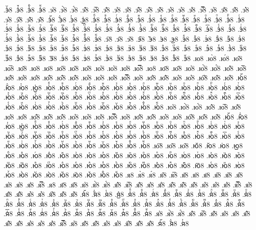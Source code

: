 {.э҅꙼8
.э҅꙽8
.э҅ꚞ8
.э҅ꚟ8
.э҆8
.э҆̀8
.э҆́8
.э҆̂8
.э҆̅8
.э҆̆8
.э҆̇8
.э҆̈8
.э҆̋8
.э҆̏8
.э҆̑8
.э҆̓8
.э҆̔8
.э҆̾8
.э҆̿8
.э҆͘8
.э҆҃8
.э҆҄8
.э҆҅8
.э҆҆8
.э҆҇8
.э҆᷀8
.э҆᷁8
.э҆᷶8
.э᷷҆8
.э᷸҆8
.э᷹҆8
.э҆ⷠ8
.э҆ⷡ8
.э҆ⷢ8
.э҆ⷣ8
.э҆ⷤ8
.э҆ⷥ8
.э҆ⷦ8
.э҆ⷧ8
.э҆ⷨ8
.э҆ⷩ8
.э҆ⷪ8
.э҆ⷫ8
.э҆ⷬ8
.э҆ⷭ8
.э҆ⷮ8
.э҆ⷯ8
.э҆ⷰ8
.э҆ⷱ8
.э҆ⷲ8
.э҆ⷳ8
.э҆ⷴ8
.э҆ⷵ8
.э҆ⷶ8
.э҆ⷷ8
.э҆ⷸ8
.э҆ⷹ8
.э҆ⷺ8
.э҆ⷻ8
.э҆ⷼ8
.э҆ⷽ8
.э҆ⷾ8
.э҆ⷿ8
.э҆꙯8
.э҆ꙴ8
.э҆ꙵ8
.э҆ꙶ8
.э҆ꙷ8
.э҆ꙸ8
.э҆ꙹ8
.э҆ꙺ8
.э҆ꙻ8
.э҆꙼8
.э҆꙽8
.э҆ꚞ8
.э҆ꚟ8
.э҇8
.э᷀8
.э᷁8
.э᷶8
.э᷷8
.э᷸8
.э᷹8
.эⷠ8
.эⷡ8
.эⷢ8
.эⷣ8
.эⷤ8
.эⷥ8
.эⷦ8
.эⷧ8
.эⷨ8
.эⷩ8
.эⷪ8
.эⷫ8
.эⷬ8
.эⷭ8
.эⷮ8
.эⷯ8
.эⷰ8
.эⷱ8
.эⷲ8
.эⷳ8
.эⷴ8
.эⷵ8
.эⷶ8
.эⷷ8
.эⷸ8
.эⷹ8
.эⷺ8
.эⷻ8
.эⷼ8
.эⷽ8
.эⷾ8
.эⷿ8
.э꙯8
.эꙴ8
.эꙵ8
.эꙶ8
.эꙷ8
.эꙸ8
.эꙹ8
.эꙺ8
.эꙻ8
.э꙼8
.э꙽8
.эꚞ8
.эꚟ8
.ю8
.ю̀8
.ю́8
.ю̂8
.ю̅8
.ю̆8
.ю̇8
.ю̈8
.ю̋8
.ю̏8
.ю̑8
.ю̓8
.ю̔8
.ю̾8
.ю̿8
.ю͘8
.ю҃8
.ю҄8
.ю҅8
.ю҅̀8
.ю҅́8
.ю҅̂8
.ю҅̅8
.ю҅̆8
.ю҅̇8
.ю҅̈8
.ю҅̋8
.ю҅̏8
.ю҅̑8
.ю҅̓8
.ю҅̔8
.ю҅̾8
.ю҅̿8
.ю҅͘8
.ю҅҃8
.ю҅҄8
.ю҅҅8
.ю҅҆8
.ю҅҇8
.ю҅᷀8
.ю҅᷁8
.ю҅᷶8
.ю᷷҅8
.ю᷸҅8
.ю᷹҅8
.ю҅ⷠ8
.ю҅ⷡ8
.ю҅ⷢ8
.ю҅ⷣ8
.ю҅ⷤ8
.ю҅ⷥ8
.ю҅ⷦ8
.ю҅ⷧ8
.ю҅ⷨ8
.ю҅ⷩ8
.ю҅ⷪ8
.ю҅ⷫ8
.ю҅ⷬ8
.ю҅ⷭ8
.ю҅ⷮ8
.ю҅ⷯ8
.ю҅ⷰ8
.ю҅ⷱ8
.ю҅ⷲ8
.ю҅ⷳ8
.ю҅ⷴ8
.ю҅ⷵ8
.ю҅ⷶ8
.ю҅ⷷ8
.ю҅ⷸ8
.ю҅ⷹ8
.ю҅ⷺ8
.ю҅ⷻ8
.ю҅ⷼ8
.ю҅ⷽ8
.ю҅ⷾ8
.ю҅ⷿ8
.ю҅꙯8
.ю҅ꙴ8
.ю҅ꙵ8
.ю҅ꙶ8
.ю҅ꙷ8
.ю҅ꙸ8
.ю҅ꙹ8
.ю҅ꙺ8
.ю҅ꙻ8
.ю҅꙼8
.ю҅꙽8
.ю҅ꚞ8
.ю҅ꚟ8
.ю҆8
.ю҆̀8
.ю҆́8
.ю҆̂8
.ю҆̅8
.ю҆̆8
.ю҆̇8
.ю҆̈8
.ю҆̋8
.ю҆̏8
.ю҆̑8
.ю҆̓8
.ю҆̔8
.ю҆̾8
.ю҆̿8
.ю҆͘8
.ю҆҃8
.ю҆҄8
.ю҆҅8
.ю҆҆8
.ю҆҇8
.ю҆᷀8
.ю҆᷁8
.ю҆᷶8
.ю᷷҆8
.ю᷸҆8
.ю᷹҆8
.ю҆ⷠ8
.ю҆ⷡ8
.ю҆ⷢ8
.ю҆ⷣ8
.ю҆ⷤ8
.ю҆ⷥ8
.ю҆ⷦ8
.ю҆ⷧ8
.ю҆ⷨ8
.ю҆ⷩ8
.ю҆ⷪ8
.ю҆ⷫ8
.ю҆ⷬ8
.ю҆ⷭ8
.ю҆ⷮ8
.ю҆ⷯ8
.ю҆ⷰ8
.ю҆ⷱ8
.ю҆ⷲ8
.ю҆ⷳ8
.ю҆ⷴ8
.ю҆ⷵ8
.ю҆ⷶ8
.ю҆ⷷ8
.ю҆ⷸ8
.ю҆ⷹ8
.ю҆ⷺ8
.ю҆ⷻ8
.ю҆ⷼ8
.ю҆ⷽ8
.ю҆ⷾ8
.ю҆ⷿ8
.ю҆꙯8
.ю҆ꙴ8
.ю҆ꙵ8
.ю҆ꙶ8
.ю҆ꙷ8
.ю҆ꙸ8
.ю҆ꙹ8
.ю҆ꙺ8
.ю҆ꙻ8
.ю҆꙼8
.ю҆꙽8
.ю҆ꚞ8
.ю҆ꚟ8
.ю҇8
.ю᷀8
.ю᷁8
.ю᷶8
.ю᷷8
.ю᷸8
.ю᷹8
.юⷠ8
.юⷡ8
.юⷢ8
.юⷣ8
.юⷤ8
.юⷥ8
.юⷦ8
.юⷧ8
.юⷨ8
.юⷩ8
.юⷪ8
.юⷫ8
.юⷬ8
.юⷭ8
.юⷮ8
.юⷯ8
.юⷰ8
.юⷱ8
.юⷲ8
.юⷳ8
.юⷴ8
.юⷵ8
.юⷶ8
.юⷷ8
.юⷸ8
.юⷹ8
.юⷺ8
.юⷻ8
.юⷼ8
.юⷽ8
.юⷾ8
.юⷿ8
.ю꙯8
.юꙴ8
.юꙵ8
.юꙶ8
.юꙷ8
.юꙸ8
.юꙹ8
.юꙺ8
.юꙻ8
.ю꙼8
.ю꙽8
.юꚞ8
.юꚟ8
.я8
.я̀8
.я́8
.я̂8
.я̅8
.я̆8
.я̇8
.я̈8
.я̋8
.я̏8
.я̑8
.я̓8
.я̔8
.я̾8
.я̿8
.я͘8
.я҃8
.я҄8
.я҅8
.я҅̀8
.я҅́8
.я҅̂8
.я҅̅8
.я҅̆8
.я҅̇8
.я҅̈8
.я҅̋8
.я҅̏8
.я҅̑8
.я҅̓8
.я҅̔8
.я҅̾8
.я҅̿8
.я҅͘8
.я҅҃8
.я҅҄8
.я҅҅8
.я҅҆8
.я҅҇8
.я҅᷀8
.я҅᷁8
.я҅᷶8
.я᷷҅8
.я᷸҅8
.я᷹҅8
.я҅ⷠ8
.я҅ⷡ8
.я҅ⷢ8
.я҅ⷣ8
.я҅ⷤ8
.я҅ⷥ8
.я҅ⷦ8
.я҅ⷧ8
.я҅ⷨ8
.я҅ⷩ8
.я҅ⷪ8
.я҅ⷫ8
.я҅ⷬ8
.я҅ⷭ8
.я҅ⷮ8
.я҅ⷯ8
.я҅ⷰ8
.я҅ⷱ8
.я҅ⷲ8
.я҅ⷳ8
.я҅ⷴ8
.я҅ⷵ8
.я҅ⷶ8
.я҅ⷷ8
.я҅ⷸ8
.я҅ⷹ8
.я҅ⷺ8
.я҅ⷻ8
.я҅ⷼ8
.я҅ⷽ8
.я҅ⷾ8
.я҅ⷿ8
.я҅꙯8
.я҅ꙴ8
.я҅ꙵ8
.я҅ꙶ8
.я҅ꙷ8
.я҅ꙸ8
.я҅ꙹ8
.я҅ꙺ8
.я҅ꙻ8
.я҅꙼8
.я҅꙽8
.я҅ꚞ8
.я҅ꚟ8
.я҆8
.я҆̀8
.я҆́8
.я҆̂8
.я҆̅8
.я҆̆8
.я҆̇8
.я҆̈8
.я҆̋8
.я҆̏8
.я҆̑8
.я҆̓8
.я҆̔8
.я҆̾8
.я҆̿8
.я҆͘8
.я҆҃8
.я҆҄8
.я҆҅8
.я҆҆8
.я҆҇8
.я҆᷀8
.я҆᷁8
.я҆᷶8
.я᷷҆8
.я᷸҆8
}
